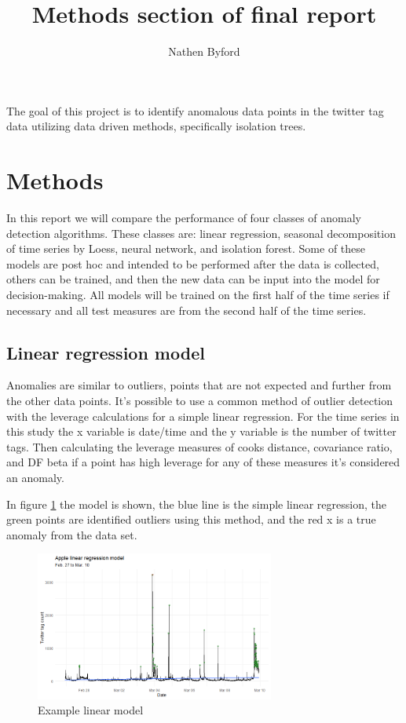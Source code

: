 \documentclass{article}
\title{Methods section of final report}
\author{Nathen Byford}
\date{}
\begin{document}
\maketitle

The goal of this project is to identify anomalous data points in the twitter tag data utilizing data driven methods, specifically isolation trees.

\section{Methods}
In this report we will compare the performance of four classes of anomaly detection algorithms. These classes are: linear regression, seasonal decomposition of time series by Loess, neural network, and isolation forest. Some of these models are post hoc and intended to be performed after the data is collected, others can be trained, and then the new data can be input into the model for decision-making. All models will be trained on the first half of the time series if necessary and all test measures are from the second half of the time series.

\subsection{Linear regression model}
Anomalies are similar to outliers, points that are not expected and further from the other data points. It's possible to use a common method of outlier detection with the leverage calculations for a simple linear regression. For the time series in this study the x variable is date/time and the y variable is the number of twitter tags. Then calculating the leverage measures of cooks distance, covariance ratio, and DF beta if a point has high leverage for any of these measures it's considered an anomaly. 

In figure \ref{fig:lm_fig} the model is shown, the blue line is the simple linear regression, the green points are identified outliers using this method, and the red x is a true anomaly from the data set.

\begin{figure}[hb]
    \centering
    \includegraphics[width=0.7\textwidth]{linear_model.png}
    \caption{Example linear model}
    \label{fig:lm_fig}
\end{figure}
\end{document}
